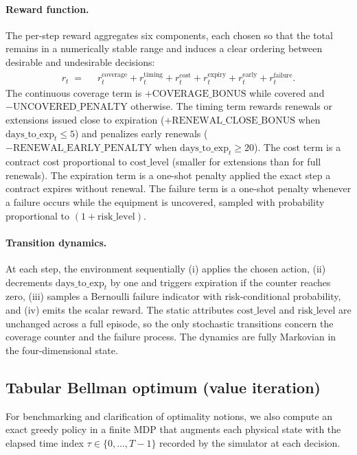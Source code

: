 \paragraph{Reward function.}
The per-step reward aggregates six components, each chosen so that the total remains in a numerically stable range and induces a clear ordering between desirable and undesirable decisions:
\begin{align*}
r_t \;=\; &\; r^{\text{coverage}}_t
          + r^{\text{timing}}_t
          + r^{\text{cost}}_t
          + r^{\text{expiry}}_t
          + r^{\text{early}}_t
          + r^{\text{failure}}_t.
\end{align*}
The continuous coverage term is $+\mathrm{COVERAGE\_BONUS}$ while covered and $-\mathrm{UNCOVERED\_PENALTY}$ otherwise. The timing term rewards renewals or extensions issued close to expiration ($+\mathrm{RENEWAL\_CLOSE\_BONUS}$ when $\mathrm{days\_to\_exp}_t \le 5$) and penalizes early renewals ($-\mathrm{RENEWAL\_EARLY\_PENALTY}$ when $\mathrm{days\_to\_exp}_t \ge 20$). The cost term is a contract cost proportional to $\mathrm{cost\_level}$ (smaller for extensions than for full renewals). The expiration term is a one-shot penalty applied the exact step a contract expires without renewal. The failure term is a one-shot penalty whenever a failure occurs while the equipment is uncovered, sampled with probability proportional to $(1 + \mathrm{risk\_level})$.


\paragraph{Transition dynamics.}
At each step, the environment sequentially (i) applies the chosen action, (ii) decrements $\mathrm{days\_to\_exp}_t$ by one and triggers expiration if the counter reaches zero, (iii) samples a Bernoulli failure indicator with risk-conditional probability, and (iv) emits the scalar reward. The static attributes $\mathrm{cost\_level}$ and $\mathrm{risk\_level}$ are unchanged across a full episode, so the only stochastic transitions concern the coverage counter and the failure process. The dynamics are fully Markovian in the four-dimensional state.


\subsection{Tabular Bellman optimum (value iteration)}
\label{subsec:vi-baseline}

For benchmarking and clarification of optimality notions, we also compute an exact greedy policy in a finite MDP that augments each physical state with the elapsed time index $\tau \in \{0,\dots,T{-}1\}$ recorded by the simulator at each decision.

